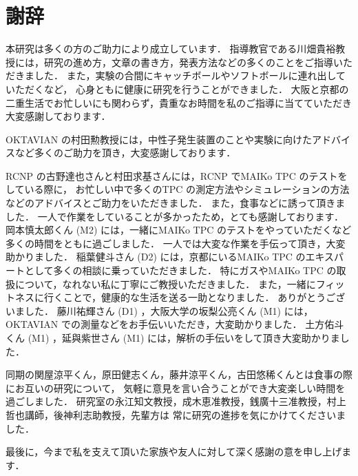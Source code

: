 \documentclass[../master]{subfiles}
\begin{document}
\chapter*{謝辞}
本研究は多くの方のご助力により成立しています．
指導教官である川畑貴裕教授には，研究の進め方，文章の書き方，発表方法などの多くのことをご指導いただきました．
また，実験の合間にキャッチボールやソフトボールに連れ出していただくなど，
心身ともに健康に研究を行うことができました．
大阪と京都の二重生活でお忙しいにも関わらず，貴重なお時間を私のご指導に当てていただき大変感謝しております．

OKTAVIAN の村田勲教授には，中性子発生装置のことや実験に向けたアドバイスなど多くのご助力を頂き，大変感謝しております．

RCNP の古野達也さんと村田求基さんには，RCNP でMAIKo TPC のテストをしている際に，
お忙しい中で多くのTPC の測定方法やシミュレーションの方法などのアドバイスとご助力をいただきました．
また，食事などに誘って頂きました．
一人で作業をしていることが多かったため，とても感謝しております．
岡本慎太郎くん (M2) には，一緒にMAIKo TPC のテストをやっていただくなど多くの時間をともに過ごしました．
一人では大変な作業を手伝って頂き，大変助かりました．
稲葉健斗さん (D2) には，京都にいるMAIKo TPC のエキスパートとして多くの相談に乗っていただきました．
特にガスやMAIKo TPC の取扱について，なれない私に丁寧にご教授いただきました．
また，一緒にフィットネスに行くことで，健康的な生活を送る一助となりました．
ありがとうございました．
藤川祐輝さん (D1) ，大阪大学の坂梨公亮くん (M1) には，OKTAVIAN での測量などをお手伝いいただき，大変助かりました．
土方佑斗くん (M1) ，延與紫世さん (M1) には，解析の手伝いをして頂き大変助かりました．

同期の関屋涼平くん，原田健志くん，藤井涼平くん，古田悠稀くんとは食事の際にお互いの研究について，
気軽に意見を言い合うことができ大変楽しい時間を過ごしました．
研究室の永江知文教授，成木恵准教授，銭廣十三准教授，村上哲也講師，後神利志助教授，先輩方は
常に研究の進捗を気にかけてくださいました．

最後に，今まで私を支えて頂いた家族や友人に対して深く感謝の意を申し上げます．
\end{document}
